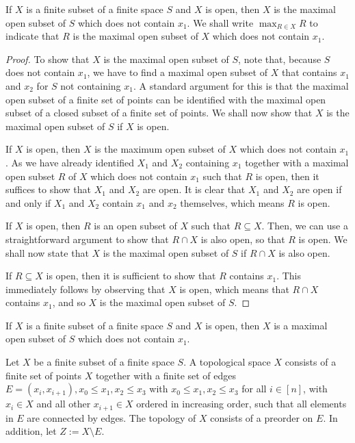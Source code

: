 \documentclass[a4paper,reqno,oneside]{article}
\begin{document}
\begin{proposition} \label{prop:maximal-open-subsets}
    If $X$ is a finite subset of a finite space $S$ and $X$ is open, then $X$ is the maximal open subset of $S$ which does not contain $x_1$.
    We shall write $\max_{R \in X} R$ to indicate that $R$ is the maximal open subset of $X$ which does not contain $x_1$.

    \begin{proof}
        To show that $X$ is the maximal open subset of $S$, note that, because $S$ does not contain $x_1$, we have to find a maximal open subset of $X$ that contains $x_1$ and $x_2$ for $S$ not containing $x_1$. A standard argument for this is that the maximal open subset of a finite set of points can be identified with the maximal open subset of a closed subset of a finite set of points. We shall now show that $X$ is the maximal open subset of $S$ if $X$ is open.
        
        If $X$ is open, then $X$ is the maximum open subset of $X$ which does not contain $x_1$. As we have already identified $X_1$ and $X_2$ containing $x_1$ together with a maximal open subset $R$ of $X$ which does not contain $x_1$ such that $R$ is open, then it suffices to show that $X_1$ and $X_2$ are open. It is clear that $X_1$ and $X_2$ are open if and only if $X_1$ and $X_2$ contain $x_1$ and $x_2$ themselves, which means $R$ is open.

        If $X$ is open, then $R$ is an open subset of $X$ such that $R \subseteq X$. Then, we can use a straightforward argument to show that $R \cap X$ is also open, so that $R$ is open. We shall now state that $X$ is the maximal open subset of $S$ if $R \cap X$ is also open.

        If $R \subseteq X$ is open, then it is sufficient to show that $R$ contains $x_1$. This immediately follows by observing that $X$ is open, which means that $R \cap X$ contains $x_1$, and so $X$ is the maximal open subset of $S$.
    \end{proof}
\end{proposition}

\begin{corollary}
    If $X$ is a finite subset of a finite space $S$ and $X$ is open, then $X$ is a maximal open subset of $S$ which does not contain $x_1$.
\end{corollary}

\begin{definition}
    Let $X$ be a finite subset of a finite space $S$. A topological space $X$ consists of a finite set of points $X$ together with a finite set of edges $E = {(x_i, x_{i+1}), x_0 \leq x_1, x_2 \leq x_3}$ with $x_0 \leq x_1, x_2 \leq x_3$ for all $i \in [n]$, with $x_i \in X$ and all other $x_{i+1} \in X$ ordered in increasing order, such that all elements in $E$ are connected by edges. The topology of $X$ consists of a preorder on $E$. In addition, let $Z := X \setminus E$.
\end{definition}
\end{document}
